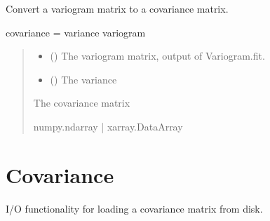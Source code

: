 \documentclass[letterpaper,10pt,english]{sphinxmanual}
\begin{document}
\begin{fulllineitems}
\label{\detokenize{covariance:glomar_gridding.variogram.variogram_to_covariance}}
\pysigstartsignatures
\pysiglinewithargsret
{}
{\sphinxparamcomma {}}
{}
\pysigstopsignatures
\sphinxAtStartPar
Convert a variogram matrix to a covariance matrix.
\begin{description}
\sphinxAtStartPar
covariance = variance \sphinxhyphen{} variogram

\end{description}
\begin{quote}\begin{description}
\begin{itemize}
\item {}
\sphinxAtStartPar
{} (\sphinxstyleliteralemphasis{\sphinxupquote{ | }}) \textendash{} The variogram matrix, output of Variogram.fit.

\item {}
\sphinxAtStartPar
{} (\sphinxstyleliteralemphasis{\sphinxupquote{ | }}) \textendash{} The variance

\end{itemize}

\sphinxAtStartPar
{} \textendash{} The covariance matrix

\sphinxAtStartPar
numpy.ndarray | xarray.DataArray

\end{description}\end{quote}

\end{fulllineitems}



\section{Covariance}
\label{\detokenize{covariance:module-glomar_gridding.interpolation_covariance}}\label{\detokenize{covariance:covariance}}
\sphinxAtStartPar
I/O functionality for loading a covariance matrix from disk.
\end{document}

